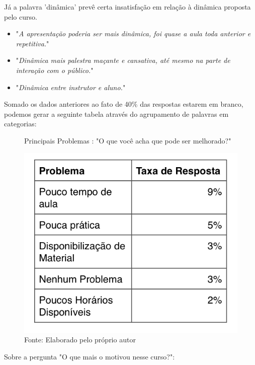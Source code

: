 Já a palavra 'dinâmica' prevê certa insatisfação em relação à dinâmica proposta pelo curso.

\begin{itemize}
\item "\textit{A apresentação poderia ser mais dinâmica, foi quase a aula toda anterior e repetitiva.}"
\item "\textit{Dinâmica mais palestra maçante e cansativa, até mesmo na parte de interação com o público.}"
\item "\textit{Dinâmica entre instrutor e aluno.}"
\end{itemize}

Somado os dados anteriores ao fato de 40\% das respostas estarem em branco, podemos gerar a seguinte tabela através do agrupamento de palavras em categorias:

\begin{figure}[H]
\caption{Principais Problemas : "O que você acha que pode ser melhorado?"}
\centerline{\includegraphics[scale=0.75]{img/melhoriasfinaltable}}
\label{fig:melhoriasfinaltable}
\caption* {Fonte: Elaborado pelo próprio autor}
\end{figure}

Sobre a pergunta "O que mais o motivou nesse curso?":

